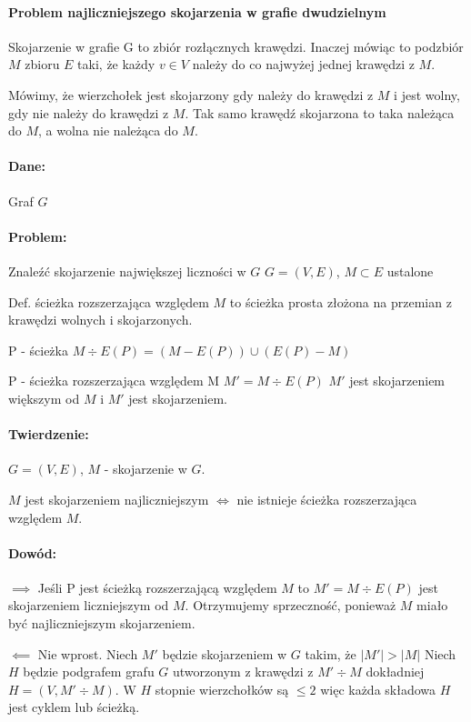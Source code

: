 \paragraph{Problem najliczniejszego skojarzenia w grafie dwudzielnym}
Skojarzenie w grafie G to zbiór rozłącznych krawędzi. Inaczej mówiąc to podzbiór $M$ zbioru $E$ taki, że każdy $v \in V$ należy do co najwyżej jednej krawędzi z $M$.

Mówimy, że wierzchołek jest skojarzony gdy należy do krawędzi z $M$ i jest wolny, gdy nie należy do krawędzi z $M$. Tak samo krawędź skojarzona to taka należąca do $M$, a wolna nie należąca do $M$.

\paragraph{Dane:}{Graf $G$}
\paragraph{Problem:}{Znaleźć skojarzenie największej liczności w $G$}
$G = (V,E)$, $M \subset E$ ustalone

Def. ścieżka rozszerzająca względem $M$ to ścieżka prosta złożona na przemian z krawędzi wolnych i skojarzonych.

P - ścieżka 
$M \div E(P) = (M- E(P)) \cup (E(P)-M)$

P - ścieżka rozszerzająca względem M
$M' = M \div E(P)$
$M'$ jest skojarzeniem większym od $M$ i $M'$ jest skojarzeniem.

\paragraph{Twierdzenie:}
$G=(V,E)$, $M$ - skojarzenie w $G$.

$M$ jest skojarzeniem najliczniejszym $\iff$ nie istnieje ścieżka rozszerzająca względem $M$.

\paragraph{Dowód:}
$\implies$ Jeśli P jest ścieżką rozszerzającą względem $M$ to $M' = M \div E(P)$ jest skojarzeniem liczniejszym od $M$. Otrzymujemy sprzeczność, ponieważ $M$ miało być najliczniejszym skojarzeniem.

$\impliedby$ Nie wprost. Niech $M'$ będzie skojarzeniem w $G$ takim, że $|M'| > |M|$
Niech $H$ będzie podgrafem grafu $G$ utworzonym z krawędzi z $M' \div M$ dokładniej $H = (V, M' \div M)$. W $H$ stopnie wierzchołków są $\leq 2$ więc każda składowa $H$ jest cyklem lub ścieżką. 

